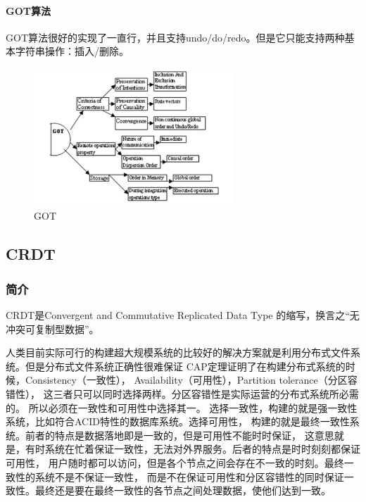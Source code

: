 \documentclass[11pt]{article}
\begin{document}
\paragraph{GOT算法}
GOT算法很好的实现了一直行，并且支持undo/do/redo。但是它只能支持两种基本字符串操作：插入/删除。
\begin{figure}[H]
    \begin{center}
    \includegraphics[width=0.67\textwidth]{figures/GOT.png}
    \caption{GOT}
    \end{center}
\end{figure}
\subsection{CRDT}
\subsubsection{简介}
CRDT是Convergent and Commutative Replicated Data Type 
的缩写，换言之“无冲突可复制型数据”。

人类目前实际可行的构建超大规模系统的比较好的解决方案就是利用分布式文件系统。但是分布式文件系统正确性很难保证
CAP定理证明了在构建分布式系统的时候，Consistency（一致性），
Availability（可用性），Partition tolerance（分区容错性），
这三者只可以同时选择两样。分区容错性是实际运营的分布式系统所必需的。
所以必须在一致性和可用性中选择其一。
选择一致性，构建的就是强一致性系统，比如符合ACID特性的数据库系统。选择可用性，
构建的就是最终一致性系统。前者的特点是数据落地即是一致的，但是可用性不能时时保证，
这意思就是，有时系统在忙着保证一致性，无法对外界服务。后者的特点是时时刻刻都保证可用性，
用户随时都可以访问，但是各个节点之间会存在不一致的时刻。最终一致性的系统不是不保证一致性，
而是不在保证可用性和分区容错性的同时保证一致性。最终还是要在最终一致性的各节点之间处理数据，使他们达到一致。
\end{document}
